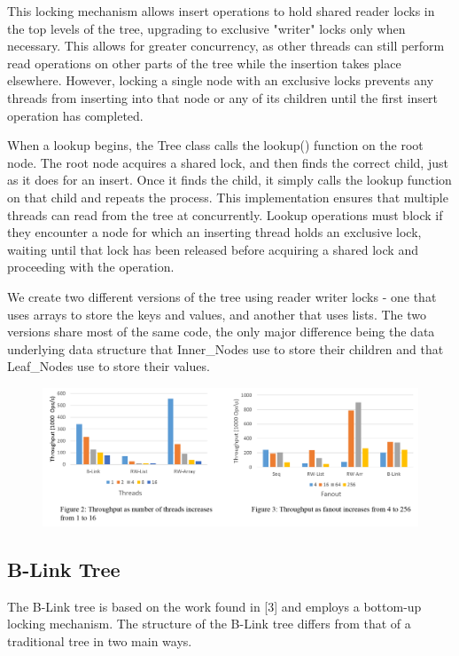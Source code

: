 \documentclass{sig-alternate}
\begin{document}
This locking mechanism allows insert operations to hold shared reader locks in the top levels of the tree, upgrading to exclusive "writer" locks only when necessary. This allows for greater concurrency, as other threads can still perform read operations on other parts of the tree while the insertion takes place elsewhere.  However, locking a single node with an exclusive locks prevents any threads from inserting into that node or any of its children until the first insert operation has completed.

When a lookup begins, the Tree class calls the lookup() function on the root node. The root node acquires a shared lock, and then finds the correct child, just as it does for an insert. Once it finds the child, it simply calls the lookup function on that child and repeats the process.  This implementation ensures that multiple threads can read from the tree at concurrently. Lookup operations must block if they encounter a node for which an inserting thread holds an exclusive lock, waiting until that lock has been released before acquiring a shared lock and proceeding with the operation.

We create two different versions of the tree using reader writer locks - one that uses arrays to store the keys and values, and another that uses lists.  The two versions share most of the same code, the only major difference being the data underlying data structure that Inner\_Nodes use to store their children and that Leaf\_Nodes use to store their values.
\begin{figure}
	\hspace{-15mm}
	\includegraphics[width=200mm]{Figure34}
\end{figure}

\subsection{B-Link Tree}
The B-Link tree is based on the work found in [3] and employs a bottom-up locking mechanism. The structure of the B-Link tree differs from that of a traditional tree in two main ways.
\end{document}
